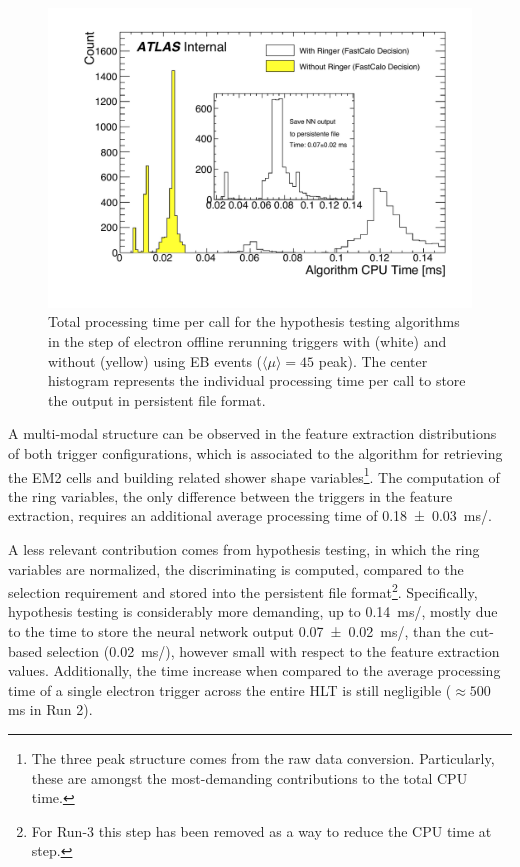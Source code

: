 \begin{figure}[h!tb]
	\includegraphics[width=.7\textwidth]{sections/03_operation/figures/EgammaHypo_TotalTime.pdf}
	\centering
	\caption{\label{fig:fastcalo_hypo_time}
		Total processing time per call for the hypothesis testing algorithms
		in the \fastcalo step of electron offline rerunning triggers with (white) and without (yellow) \rnn{} using EB events ($\langle \mu \rangle = 45$ peak). The center histogram represents the individual processing time per call to store the \rnn{} output in persistent file format.}
\end{figure}

A multi-modal structure can be observed in the feature extraction distributions of both trigger configurations, which is associated to the algorithm for retrieving the EM2 cells and building related shower shape
variables\footnote{The three peak structure comes from the raw data conversion. Particularly, these are amongst the most-demanding contributions to the \fastcalo total CPU time.}. The computation of the ring variables, the only difference between the triggers in the \fastcalo feature extraction, requires an additional average processing time of \SI{0.18 \pm 0.03}{\ms/}. 


A less relevant contribution comes from hypothesis testing, in which the ring variables are normalized, the discriminating is computed, compared to the selection requirement and stored into the persistent file format\footnote{For Run-3 this step has been removed as a way to reduce the CPU time at \fastcalo step.}. Specifically, \rnn{} hypothesis testing is considerably more demanding, up to \SI{0.14}{\ms/}, mostly due to the time 
to store the neural network output \SI{0.07 \pm 0.02}{\ms/}, 
than the cut-based selection (\SI{0.02}{\ms/}), however small with respect to the feature extraction values. Additionally, the time increase when compared to the average processing time of a single electron trigger across the entire HLT is still negligible ($\approx 500$ ms in Run 2).

